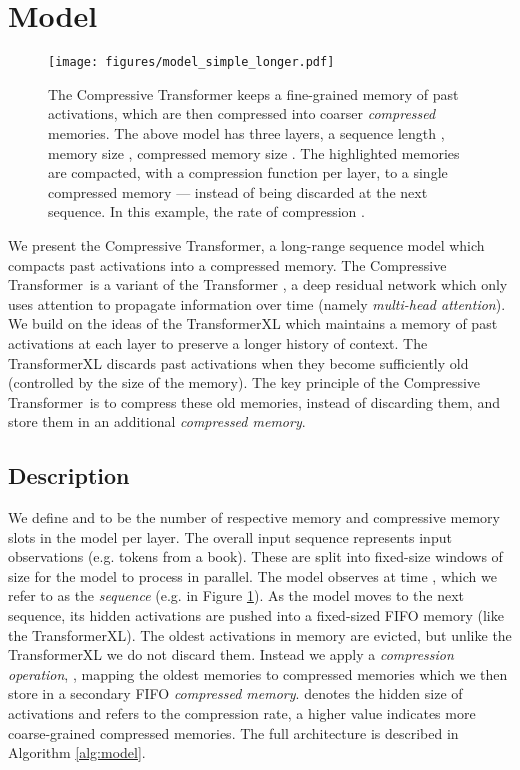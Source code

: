 \documentclass{article} \usepackage{iclr2020_conference,times}
\newcommand{\model}{Compressive Transformer}
\begin{document}
\section{Model}
 \begin{figure}
     \centering
     \texttt{[image: figures/model\_simple\_longer.pdf]}
     \caption{The Compressive Transformer keeps a fine-grained memory of past activations, which are then compressed into coarser \textit{compressed} memories. The above model has three layers, a sequence length , memory size , compressed memory size . The highlighted memories are compacted, with a compression function  per layer, to a single compressed memory --- instead of being discarded at the next sequence. In this example, the rate of compression .}
     \label{fig:model}
 \end{figure}
We present the \model, a long-range sequence model which compacts past activations into a compressed memory. The \model~is a variant of the Transformer \citep{vaswani2017attention}, a deep residual network which only uses attention to propagate information over time (namely \textit{multi-head attention}). We build on the ideas of the TransformerXL \citep{dai2019transformer} which maintains a memory of past activations at each layer to preserve a longer history of context. The TransformerXL discards past activations when they become sufficiently old (controlled by the size of the memory). The key principle of the \model~is to compress these old memories, instead of discarding them, and store them in an additional \textit{compressed memory}. 

\subsection{Description}
We define  and  to be the number of respective memory and compressive memory slots in the model per layer. The overall input sequence  represents input observations (e.g. tokens from a book). These are split into fixed-size windows of size  for the model to process in parallel. The model observes  at time , which we refer to as the \textit{sequence} (e.g. in Figure \ref{fig:model}). As the model moves to the next sequence, its  hidden activations are pushed into a fixed-sized FIFO memory (like the TransformerXL). The oldest  activations in memory are evicted, but unlike the TransformerXL we do not discard them. Instead we apply a \textit{compression operation}, , mapping the  oldest memories to  compressed memories which we then store in a secondary FIFO \textit{compressed memory}.  denotes the hidden size of activations and  refers to the compression rate, a higher value indicates more coarse-grained compressed memories. The full architecture is described in Algorithm \ref{alg:model}.
\end{document}
